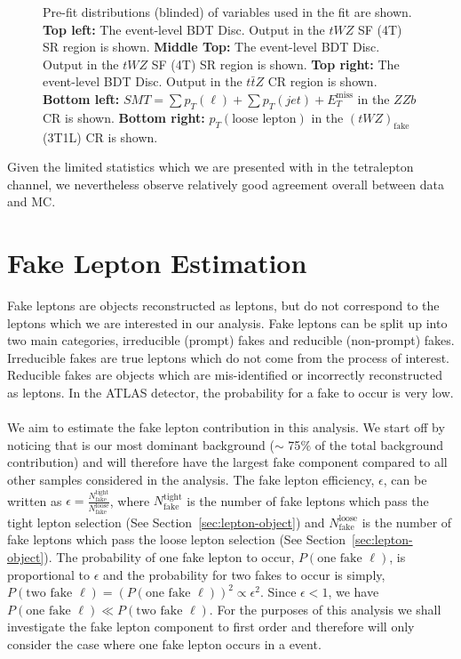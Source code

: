 \begin{figure}[htbp]
        \caption{Pre-fit distributions (blinded) of variables used in the fit are shown. \textbf{Top left:} The event-level BDT Disc. Output in the $tWZ$ SF (4T) SR region is shown. \textbf{Middle Top:} The event-level BDT Disc. Output in the $tWZ$ SF (4T) SR region is shown. \textbf{Top right:} The event-level BDT Disc. Output in the $t\bar{t}Z$ CR region is shown. \textbf{Bottom left:} $SMT = \sum p_{T} (\ell) + \sum p_{T} (jet) + E_{T}^{\text{miss}}$ in the $ZZb$ CR is shown. \textbf{Bottom right:} $p_{T}(\text{loose lepton})$ in the $(tWZ)_{\text{fake}}$ (3T1L) CR is shown.}
  \label{fig:4lep-prefitPlots}
\end{figure}


Given the limited statistics which we are presented with in the tetralepton channel, we nevertheless observe relatively good agreement overall between data and MC.

\section{Fake Lepton Estimation}
\label{sec:fakelepest}
Fake leptons are objects reconstructed as leptons, but do not correspond to the leptons which we are interested in our analysis. Fake leptons can be split up into two main categories, irreducible (prompt) fakes and reducible (non-prompt) fakes. Irreducible fakes are true leptons which do not come from the process of interest. Reducible fakes are objects which are mis-identified or incorrectly reconstructed as leptons. In the ATLAS detector, the probability for a fake to occur is very low.\\\\

We aim to estimate the fake lepton contribution in this analysis. We start off by noticing that \ttZ is our most dominant background ($\sim$ 75$\%$ of the total background contribution) and will therefore have the largest fake component compared to all other samples considered in the analysis. The fake lepton efficiency, $\epsilon$, can be written as $\epsilon = \frac{N_{\text{fake}}^{\text{tight}}}{N_{\text{fake}}^{\text{loose}}}$, where $N_{\text{fake}}^{\text{tight}}$ is the number of fake leptons which pass the tight lepton selection (See Section~\ref{sec:lepton-object}) and $N_{\text{fake}}^{\text{loose}}$ is the number of fake leptons which pass the loose lepton selection (See Section~\ref{sec:lepton-object}). The probability of one fake lepton to occur, $P(\text{one fake }\ell)$, is proportional to $\epsilon$ and the probability for two fakes to occur is simply, $P(\text{two fake }\ell) = (P(\text{one fake }\ell))^{2} \propto \epsilon^{2}$. Since $\epsilon < 1$, we have $P(\text{one fake }\ell) \ll P(\text{two fake }\ell)$. For the purposes of this analysis we shall investigate the fake lepton component to first order and therefore will only consider the case where one fake lepton occurs in a \ttZ event.\\\\

